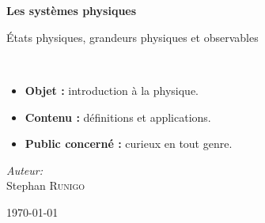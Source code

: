 \begin{titlepage}
%
~\\[1cm]

\begin{center}
\end{center}

\textsc{\Large }\\[0.5cm]

\HRule

\begin{center}
{\huge \bfseries  Les systèmes physiques\\ }
 
{\Large États physiques, grandeurs physiques et observables\\}%
\end{center}

\HRule \\[1.5cm]

\vspace{3cm}
\begin{itemize}[leftmargin=1cm, label=, itemsep=2pt]
\item {\bf Objet :} introduction à la physique.
\item {\bf Contenu :} définitions et applications.
\item {\bf Public concerné :} curieux en tout genre.
\end{itemize}
\vspace{3cm}


\begin{minipage}{0.4\textwidth}
\begin{flushleft} \large
\end{flushleft}
\end{minipage}
\begin{minipage}{0.4\textwidth}
\begin{flushright} \large
\emph{Auteur:}\\
Stephan \textsc{Runigo}
\end{flushright}
\end{minipage}

\vfill

{\large \today}

\end{titlepage}
